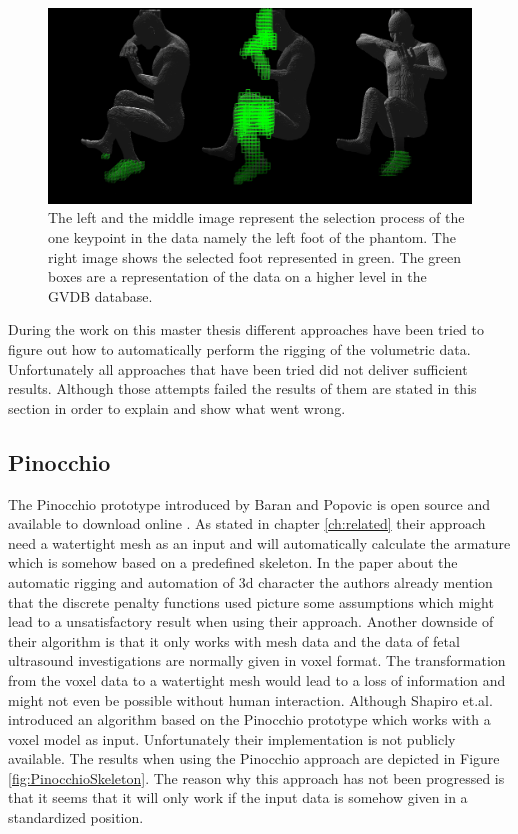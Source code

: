 \begin{figure} [!htb]
    \centering
	\includegraphics[width=14cm]{content/images/gvdb}
	\caption{The left and the middle image represent the selection process of the one keypoint in the data namely the left foot of the phantom. The right image shows the selected foot represented in green. The green boxes are a representation of the data on a higher level in the GVDB database.} 
	\label{fig:gvdb}
\end{figure}
\newpage
During the work on this master thesis different approaches have been tried to figure out how to automatically perform the rigging of the volumetric data. Unfortunately all approaches that have been tried did not deliver sufficient results. Although those attempts failed the results of them are stated in this section in order to explain and show what went wrong.

\subsection{Pinocchio}
The Pinocchio prototype introduced by Baran and Popovic is open source and available to download online \cite{Baran2007}. As stated in chapter \ref{ch:related} their approach need a watertight mesh as an input and will automatically calculate the armature which is somehow based on a predefined skeleton. In the paper about the automatic rigging and automation of \gls{3d} character the authors already mention that the discrete penalty functions used picture some assumptions which might lead to a unsatisfactory result when using their approach. Another downside of their algorithm is that it only works with mesh data and the data of fetal ultrasound investigations are normally given in voxel format. The transformation from the voxel data to a watertight mesh would lead to a loss of information and might not even be possible without human interaction. Although Shapiro et.al. introduced an algorithm based on the Pinocchio prototype which works with a voxel model as input. Unfortunately their implementation is not publicly available. The results when using the Pinocchio approach are depicted in Figure \ref{fig:PinocchioSkeleton}. The reason why this approach has not been progressed is that it seems that it will only work if the input data is somehow given in a standardized position.

